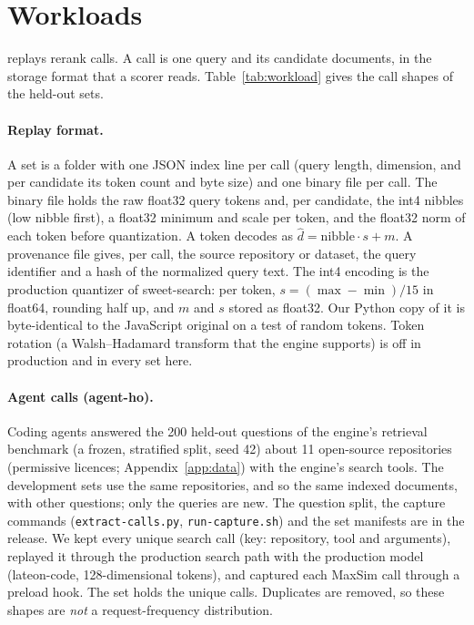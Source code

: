 \section{Workloads}
\label{sec:workload}

\benchname replays rerank calls.
A call is one query and its candidate documents, in the storage format that a scorer reads.
Table~\ref{tab:workload} gives the call shapes of the held-out sets.

\paragraph{Replay format.}
A set is a folder with one JSON index line per call (query length, dimension, and per candidate its token count and byte size) and one binary file per call.
The binary file holds the raw float32 query tokens and, per candidate, the int4 nibbles (low nibble first), a float32 minimum and scale per token, and the float32 norm of each token before quantization.
A token decodes as $\hat d = \text{nibble}\cdot s + m$.
A provenance file gives, per call, the source repository or dataset, the query identifier and a hash of the normalized query text.
The int4 encoding is the production quantizer of sweet-search: per token, $s = (\max - \min)/15$ in float64, rounding half up, and $m$ and $s$ stored as float32.
Our Python copy of it is byte-identical to the JavaScript original on a test of random tokens.
Token rotation (a Walsh--Hadamard transform that the engine supports) is off in production and in every set here.

\paragraph{Agent calls (agent-ho).}
Coding agents answered the 200 held-out questions of the engine's retrieval benchmark (a frozen, stratified split, seed 42) about 11 open-source repositories (permissive licences; Appendix~\ref{app:data}) with the engine's search tools.
The development sets use the same repositories, and so the same indexed documents, with other questions; only the queries are new. The question split, the capture commands (\texttt{extract-calls.py}, \texttt{run-capture.sh}) and the set manifests are in the release.
We kept every unique search call (key: repository, tool and arguments), replayed it through the production search path with the production model (lateon-code, 128-dimensional tokens), and captured each MaxSim call through a preload hook.
The set holds the  unique calls.
Duplicates are removed, so these shapes are \emph{not} a request-frequency distribution.

